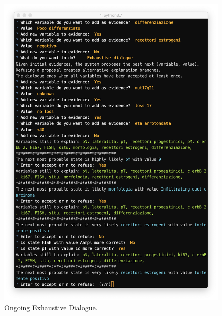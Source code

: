 \begin{figure}[htbp]
\centerline{\includegraphics[width=\columnwidth]{results/images/sw_5_exhaustive_dialogue}}
\caption{Ongoing Exhaustive Dialogue.}
\label{fig:sw_5_exhaustive_dialogue}
\end{figure}

